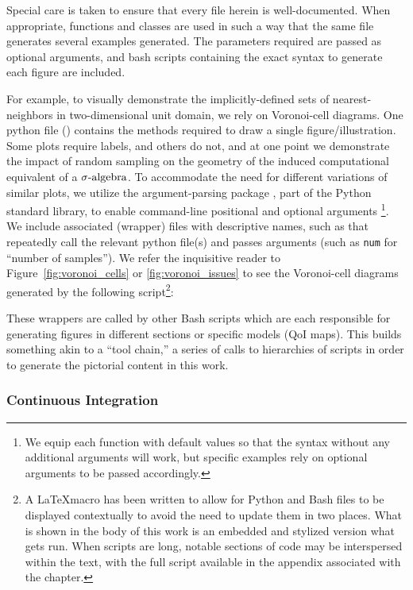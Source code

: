 Special care is taken to ensure that every file herein is well-documented.
When appropriate, functions and classes are used in such a way that the same file generates several examples generated.
The parameters required are passed as optional arguments, and bash scripts containing the exact syntax to generate each figure are included.

For example, to visually demonstrate the implicitly-defined sets of nearest-neighbors in two-dimensional unit domain, we rely on Voronoi-cell diagrams.
One python file () contains the methods required to draw a single figure/illustration.
Some plots require labels, and others do not, and at one point we demonstrate the impact of random sampling on the geometry of the induced computational equivalent of a $\sigma\text{-algebra}$.
To accommodate the need for different variations of similar plots, we utilize the argument-parsing package , part of the Python standard library, to enable command-line positional and optional arguments \footnote{We equip each function with default values so that the syntax  without any additional arguments will work, but specific examples rely on optional arguments to be passed accordingly.}.
We include associated (wrapper) files with descriptive names, such as  that repeatedly call the relevant python file(s) and passes arguments (such as {\tt num} for ``number of samples'').
We refer the inquisitive reader to  Figure~\ref{fig:voronoi_cells} or \ref{fig:voronoi_issues} to see the Voronoi-cell diagrams generated by the following script\footnote{A \LaTeX macro has been written to allow for Python and Bash files to be displayed contextually to avoid the need to update them in two places. What is shown in the body of this work is an embedded and stylized version what gets run. When scripts are long, notable sections of code may be interspersed within the text, with the full script available in the appendix associated with the chapter.}:



These wrappers are called by other Bash scripts which are each responsible for generating figures in different sections or specific models (QoI maps).
This builds something akin to a ``tool chain,'' a series of calls to hierarchies of scripts in order to generate the pictorial content in this work.


\subsubsection{Continuous Integration}\label{sec:continuous-integration}

